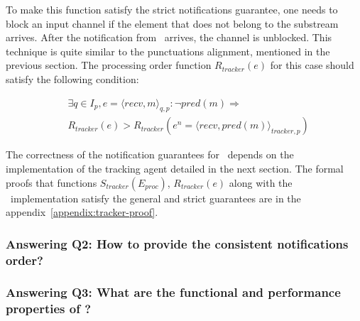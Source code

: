 To make this function satisfy the strict notifications guarantee, one needs to block an input channel if the element that does not belong to the substream arrives. After the notification from \tracker\ arrives, the channel is unblocked. This technique is quite similar to the punctuations alignment, mentioned in the previous section. The processing order function $R_{tracker}(e)$ for this case should satisfy the following condition:

\begin{align*}
& \exists q \in I_p, e = \langle recv,m \rangle_{q,p}: \neg pred(m) \Longrightarrow \\ 
& R_{tracker}(e) > R_{tracker}(e^{n}= \langle recv,pred(m) \rangle_{tracker,p})
\end{align*}

The correctness of the notification guarantees for \tracker\ depends on the implementation of the tracking agent detailed in the next section. The formal proofs that functions $S_{tracker}(E_{proc})$, $R_{tracker}(e)$ along with the \tracker\ implementation satisfy the general and strict guarantees are in the appendix~\ref{appendix:tracker-proof}.

\subsubsection{Answering Q2: How to provide the consistent notifications order?}

\subsubsection{Answering Q3: What are the functional and performance properties of \tracker?}
